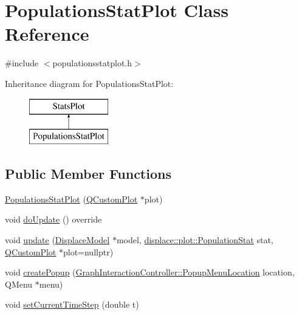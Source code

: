 \hypertarget{class_populations_stat_plot}{}\section{Populations\+Stat\+Plot Class Reference}
\label{class_populations_stat_plot}


{\ttfamily \#include $<$populationsstatplot.\+h$>$}

Inheritance diagram for Populations\+Stat\+Plot\+:\begin{figure}[H]
\begin{center}
\leavevmode
\includegraphics[height=2.000000cm]{da/d02/class_populations_stat_plot}
\end{center}
\end{figure}
\subsection*{Public Member Functions}
\begin{DoxyCompactItemize}
\item 
\mbox{\hyperlink{class_populations_stat_plot_acb6333030f68073a2c38b7c848a0e79b}{Populations\+Stat\+Plot}} (\mbox{\hyperlink{class_q_custom_plot}{Q\+Custom\+Plot}} $\ast$plot)
\item 
void \mbox{\hyperlink{class_populations_stat_plot_aff1464474d75cbc646aa3bd9857cbc47}{do\+Update}} () override
\item 
void \mbox{\hyperlink{class_populations_stat_plot_a87c8b973ab29dd743cb47c1e910bd7c3}{update}} (\mbox{\hyperlink{class_displace_model}{Displace\+Model}} $\ast$model, \mbox{\hyperlink{namespacedisplace_1_1plot_a523612c6239ff69acc3e5b7c5b40b618}{displace\+::plot\+::\+Population\+Stat}} stat, \mbox{\hyperlink{class_q_custom_plot}{Q\+Custom\+Plot}} $\ast$plot=nullptr)
\item 
void \mbox{\hyperlink{class_populations_stat_plot_a5a42ee8a02dab2c1d004f6fc2646cca7}{create\+Popup}} (\mbox{\hyperlink{class_graph_interaction_controller_a67e6eba082927bf2b984bed54fe32764}{Graph\+Interaction\+Controller\+::\+Popup\+Menu\+Location}} location, Q\+Menu $\ast$menu)
\item 
void \mbox{\hyperlink{class_populations_stat_plot_aade36ca5bd086ba4735985f4389f9c42}{set\+Current\+Time\+Step}} (double t)
\end{DoxyCompactItemize}
